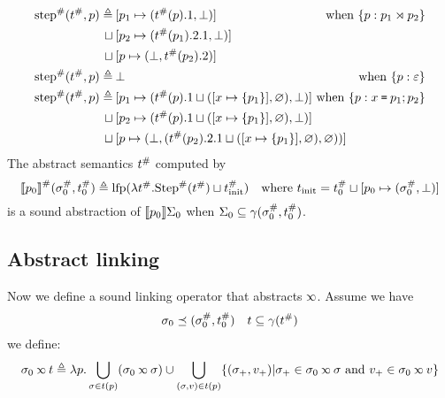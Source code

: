 \begin{align*}
  \Abs\step(\Abs\ptree,p) \triangleq & \specialcell{\:[p_1\mapsto(\Abs\ptree(p).1,\bot)]\hfill\textnormal{when }\plabel{p}{{p_1}\synlink{p_2}}}                                           \\
  \sqcup                             & \: [p_2\mapsto(\Abs\ptree(p_1).2.1,\bot)]                                                                                                          \\
  \sqcup                             & \: [p\mapsto(\bot,\Abs\ptree(p_2).2)]                                                                                                              \\
  \Abs\step(\Abs\ptree,p) \triangleq & \specialcell{\:\bot\hfill\textnormal{when }\plabel{p}{\varepsilon}}                                                                                \\
  \Abs\step(\Abs\ptree,p) \triangleq & \specialcell{\:[p_1\mapsto(\Abs\ptree(p).1\sqcup([x\mapsto\{p_1\}],\varnothing),\bot)]\hfill\textnormal{ when }\plabel{p}{x\:\texttt{=}\:p_1;p_2}} \\
  \sqcup                             & \: [p_2\mapsto(\Abs\ptree(p).1\sqcup([x\mapsto\{p_1\}],\varnothing),\bot)]                                                                         \\
  \sqcup                             & \: [p\mapsto(\bot,(\Abs\ptree(p_2).2.1\sqcup([x\mapsto\{p_1\}],\varnothing),\varnothing))]
\end{align*}
The abstract semantics ${t}^{\#}$ computed by
\[{\llbracket{p_0}\rrbracket}^{\#}({\sigma}^{\#}_0,{t}^{\#}_0)\triangleq\textnormal{lfp}(\lambda{t}^{\#}.{\textnormal{Step}}^{\#}({t}^{\#})\sqcup{t}^{\#}_{\textnormal{init}})\quad\textnormal{where }t_{\textnormal{init}}={t}^{\#}_0\sqcup[p_0\mapsto({\sigma}^{\#}_0,\bot)]\]
is a sound abstraction of $\llbracket{p_0}\rrbracket\Sigma_0$ when $\Sigma_0\subseteq\gamma({\sigma}^{\#}_0,{t}^{\#}_0)$.

\subsection{Abstract linking}
Now we define a sound linking operator that abstracts $\semlink$.
Assume we have
\[\sigma_0\preceq({\sigma}^{\#}_0,{t}^{\#}_0)\quad t\subseteq\gamma({t}^{\#})\]
we define:
\[\ctx_0\semlink\ptree\triangleq\lambda p.\bigcup_{\ctx\in t(p)}(\ctx_0\semlink\ctx)\cup\bigcup_{(\ctx,v)\in t(p)}\{(\ctx_+,v_+)|\ctx_+\in\ctx_0\semlink\ctx\textnormal{ and }v_+\in\ctx_0\semlink v\}\]

